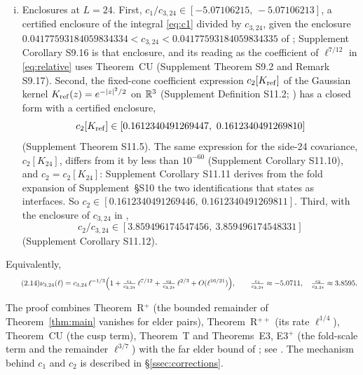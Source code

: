 \begin{theorem}
\begin{enumerate}[(i)]
\item Enclosures at $L=24$. First, $c_1/c_{3,24}\in[-5.07106215,\,-5.07106213]$, a certified enclosure of the integral \eqref{eq:c1} divided by $c_{3,24}$, given the enclosure $0.04177593184059834334<c_{3,24}<0.04177593184059834335$ of  ; Supplement Corollary S9.16 is that enclosure, and its reading as the coefficient of $\ell^{7/12}$ in \eqref{eq:relative} uses Theorem~CU (Supplement Theorem S9.2 and Remark S9.17). Second, the fixed-cone coefficient expression $c_2[K_{\rm ref}]$ of the Gaussian kernel $K_{\rm ref}(z)=e^{-|z|^2/2}$ on $\mathbb R^3$ (Supplement Definition S11.2; ) has a closed form with a certified enclosure,
\[
c_2[K_{\rm ref}]\in[0.1612340491269447,\ 0.1612340491269810]
\]
(Supplement Theorem S11.5). The same expression for the side-24 covariance, $c_2[K_{24}]$, differs from it by less than $10^{-60}$ (Supplement Corollary S11.10), and $c_2=c_2[K_{24}]$: Supplement Corollary S11.11 derives from the fold expansion of Supplement~\S S10 the two identifications that  states as interfaces. So $c_2\in[0.1612340491269446,\ 0.1612340491269811]$. Third, with the enclosure of $c_{3,24}$ in ,
\[
c_2/c_{3,24}\in[3.859496174547456,\ 3.859496174548331]
\]
(Supplement Corollary S11.12).
\end{enumerate}
Equivalently,
\begin{equation}\tag{2.14}\label{eq:relative}
\nu_{3,24}(\ell)=c_{3,24}\,\ell^{-1/3}\Bigl(1+\tfrac{c_1}{c_{3,24}}\,\ell^{7/12}+\tfrac{c_2}{c_{3,24}}\,\ell^{2/3}+O(\ell^{16/21})\Bigr),\qquad
\tfrac{c_1}{c_{3,24}}\approx-5.0711,\quad \tfrac{c_2}{c_{3,24}}\approx3.8595 .
\end{equation}
\end{theorem}

The proof combines Theorem~R$^+$ (the bounded remainder of Theorem~\ref{thm:main} vanishes for elder pairs), Theorem~R$^{++}$ (its rate $\ell^{1/4}$), Theorem~CU (the cusp term), Theorem~T and Theorems~E3, E3$^+$ (the fold-scale term and the remainder $\ell^{3/7}$) with the far elder bound of ; see . The mechanism behind $c_1$ and $c_2$ is described in \S\ref{ssec:corrections}.

